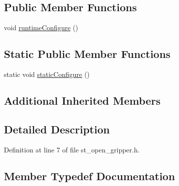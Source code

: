 \subsection*{Public Member Functions}
\begin{DoxyCompactItemize}
\item 
void \hyperlink{structsm__fetch__two__table__pick__n__place__1_1_1place__states_1_1StOpenGripper_aee8c0464ce934e57ac581b8dbf384cd1}{runtime\+Configure} ()
\end{DoxyCompactItemize}
\subsection*{Static Public Member Functions}
\begin{DoxyCompactItemize}
\item 
static void \hyperlink{structsm__fetch__two__table__pick__n__place__1_1_1place__states_1_1StOpenGripper_ab948c66ace6e1e3fe22e6b34f4ae2668}{static\+Configure} ()
\end{DoxyCompactItemize}
\subsection*{Additional Inherited Members}


\subsection{Detailed Description}


Definition at line 7 of file st\+\_\+open\+\_\+gripper.\+h.



\subsection{Member Typedef Documentation}
\mbox{\label{structsm__fetch__two__table__pick__n__place__1_1_1place__states_1_1StOpenGripper_a9440af06479efb0aad6bce0d9469c8c9}} 
